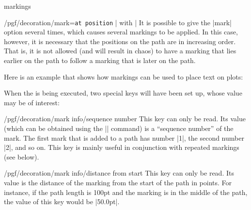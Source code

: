 \begin{decoration}{markings}
\begin{key}{/pgf/decoration/mark=\texttt{at position} | with |}
        It is possible to give the |mark| option several times, which causes
        several markings to be applied. In this case, however, it is necessary
        that the positions on the path are in increasing order. That is, it is
        not allowed (and will result in chaos) to have a marking that lies
        earlier on the path to follow a marking that is later on the path.
\begin{codeexample}[]
\end{codeexample}

        Here is an example that shows how markings can be used to place text on
        plots:
\begin{codeexample}[]
\end{codeexample}

        When the  is being executed, two special keys will have been
        set up, whose value may be of interest:
        \begin{key}{/pgf/decoration/mark info/sequence number}
            This key can only be read. Its value (which can be obtained using
            the |\pgfkeysvalueof| command) is a ``sequence number'' of the
            mark. The first mark that is added to a path has number |1|, the
            second number |2|, and so on. This key is mainly useful in
            conjunction with repeated markings (see below).
        \end{key}
        \begin{key}{/pgf/decoration/mark info/distance from start}
            This key can only be read. Its value is the distance of the marking
            from the start of the path in points. For instance, if the path
            length is 100pt and the marking is in the middle of the path, the
            value of this key would be |50.0pt|.
        \end{key}
    \end{key}


\end{decoration}
